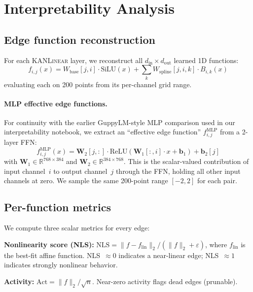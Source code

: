 \documentclass{article}
\newcommand{\fij}{f_{i,j}}
\newcommand{\kanlinear}{\textsc{KANLinear}}
\begin{document}
\section{Interpretability Analysis}
\label{sec:interpretability}

\subsection{Edge function reconstruction}

For each \kanlinear{} layer, we reconstruct all $d_\text{in}\!\times\!d_\text{out}$
learned 1D functions:
\begin{equation}
  \fij(x) = W_\text{base}[j,i]\cdot\text{SiLU}(x)
           + \sum_k W_\text{spline}[j,i,k]\cdot B_{i,k}(x)
\end{equation}
evaluating each on 200 points from its per-channel grid range.

\paragraph{MLP effective edge functions.}
For continuity with the earlier GuppyLM-style MLP comparison used in our
interpretability notebook, we extract an ``effective edge function''
$\fij^\text{MLP}$ from a 2-layer FFN:
\begin{equation}
  \fij^\text{MLP}(x) = \mathbf{W}_2[j,:]\cdot\text{ReLU}(\mathbf{W}_1[:,i]\cdot x + \mathbf{b}_1) + \mathbf{b}_2[j]
\end{equation}
with $\mathbf{W}_1\in\mathbb{R}^{768\times384}$ and $\mathbf{W}_2\in\mathbb{R}^{384\times768}$.
This is the scalar-valued contribution of input channel~$i$ to output channel~$j$
through the FFN, holding all other input channels at zero.
We sample the same 200-point range $[-2, 2]$ for each pair.

\subsection{Per-function metrics}

We compute three scalar metrics for every edge:

\textbf{Nonlinearity score (NLS):}
$\text{NLS} = \|f - f_\text{lin}\|_2 / (\|f\|_2 + \varepsilon)$,
where $f_\text{lin}$ is the best-fit affine function.
NLS~$\approx 0$ indicates a near-linear edge; NLS~$\approx 1$ indicates
strongly nonlinear behavior.

\textbf{Activity:}
$\text{Act} = \|f\|_2 / \sqrt{n}$.
Near-zero activity flags dead edges (prunable).
\end{document}

